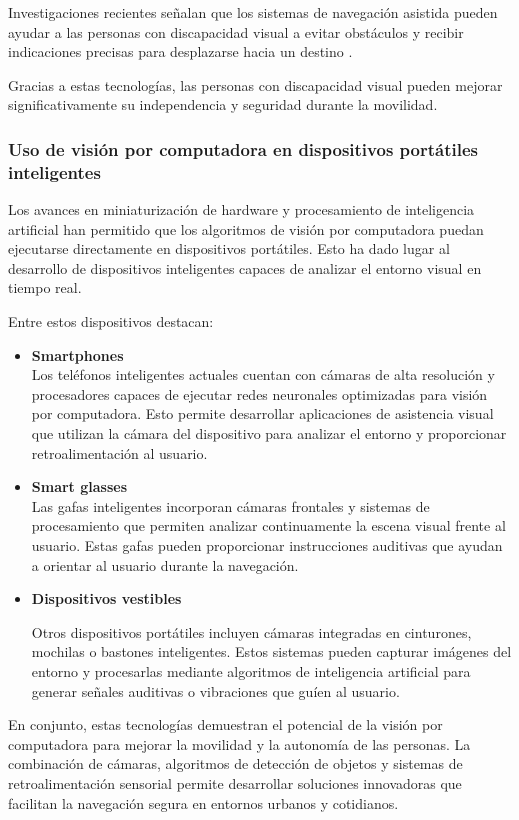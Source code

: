 Investigaciones recientes señalan que los sistemas de navegación asistida pueden ayudar a las personas con discapacidad visual a evitar obstáculos y recibir indicaciones precisas para desplazarse hacia un destino \cite{pmc_assistive_systems}.

Gracias a estas tecnologías, las personas con discapacidad visual pueden mejorar significativamente su independencia y seguridad durante la movilidad.
\subsubsection{Uso de visión por computadora en dispositivos portátiles inteligentes}
Los avances en miniaturización de hardware y procesamiento de inteligencia artificial han permitido que los algoritmos de visión por computadora puedan ejecutarse directamente en dispositivos portátiles. Esto ha dado lugar al desarrollo de dispositivos inteligentes capaces de analizar el entorno visual en tiempo real.

Entre estos dispositivos destacan:
\begin{itemize}
    \item \textbf{Smartphones}
\\
Los teléfonos inteligentes actuales cuentan con cámaras de alta resolución y procesadores capaces de ejecutar redes neuronales optimizadas para visión por computadora. Esto permite desarrollar aplicaciones de asistencia visual que utilizan la cámara del dispositivo para analizar el entorno y proporcionar retroalimentación al usuario.
\item \textbf{Smart glasses}
\\
Las gafas inteligentes incorporan cámaras frontales y sistemas de procesamiento que permiten analizar continuamente la escena visual frente al usuario. Estas gafas pueden proporcionar instrucciones auditivas que ayudan a orientar al usuario durante la navegación.
\item \textbf{Dispositivos vestibles}

Otros dispositivos portátiles incluyen cámaras integradas en cinturones, mochilas o bastones inteligentes. Estos sistemas pueden capturar imágenes del entorno y procesarlas mediante algoritmos de inteligencia artificial para generar señales auditivas o vibraciones que guíen al usuario.
\end{itemize}


En conjunto, estas tecnologías demuestran el potencial de la visión por computadora para mejorar la movilidad y la autonomía de las personas. La combinación de cámaras, algoritmos de detección de objetos y sistemas de retroalimentación sensorial permite desarrollar soluciones innovadoras que facilitan la navegación segura en entornos urbanos y cotidianos.